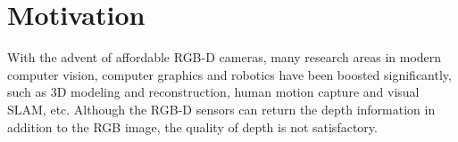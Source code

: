 
\section{Motivation}
With the advent of affordable RGB-D cameras, many research areas in modern computer vision, computer graphics and robotics have been boosted significantly, such as 3D modeling and reconstruction, human motion capture and visual SLAM, etc.
Although the RGB-D sensors can return the depth information in addition to the RGB image, the quality of depth is not satisfactory.


